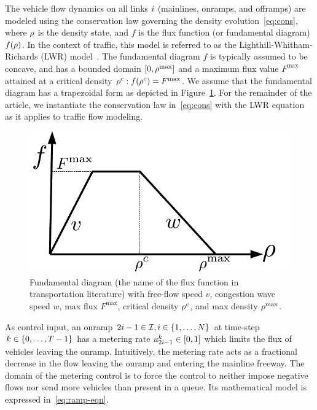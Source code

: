 		
		The vehicle flow dynamics on all links $i$ (mainlines, onramps,
		and offramps) are modeled using the conservation law governing the
		density evolution~\eqref{eq:cons}, where $\rho$ is the
		density state, and $f$ is the flux function (or fundamental diagram)
		$f\left(\density\right)$. In the context of traffic, this model is
		referred to as the Lighthill-Whitham-Richards (LWR) model~\cite{lighthill1955kinematic,richards1956shock}.
		The fundamental diagram $f$ is typically assumed to be concave, and
		has a bounded domain $\left[0,\density^{\max}\right]$ and a maximum
		flux value $F^{\max}$ attained at a critical density $\density^{c}:f\left(\density^{c}\right)=F^{\max}$.
		We assume that the fundamental diagram has a trapezoidal form as depicted
		in Figure~\ref{fig:Fundamental-diagram-with}. For the remainder
		of the article, we instantiate the conservation law in~\eqref{eq:cons}
		with the LWR equation as it applies to traffic flow modeling.\begin{figure}%
		\begin{centering}
			\includegraphics[width=0.4\columnwidth]{figs-gen/fd}
			\par\end{centering}
			
			\caption{Fundamental diagram (the name of the flux function in transportation
				literature) with free-flow speed $v$, congestion wave speed $w$,
				max flux $F^{\max}$, critical density $\rho^{c}$, and max density
				$\rho^{\max}$.\label{fig:Fundamental-diagram-with}}
			\end{figure}%
			
			
			As control input, an onramp $2\link-1\in\links,\link\in\intrange 1{\nlinks}$
			at time-step $k\in\intrange 0{\ntime-1}$ has a metering rate $\ramp_{2\link-1}^{\tind}\in\left[0,1\right]$
			which limits the flux of vehicles leaving the onramp. Intuitively,
			the metering rate acts as a fractional decrease in the flow leaving
			the onramp and entering the mainline freeway. The domain of the metering
			control is to force the control to neither impose negative flows nor
			send more vehicles than present in a queue. Its mathematical model
			is expressed in~\eqref{eq:ramp-eqn}.
			
